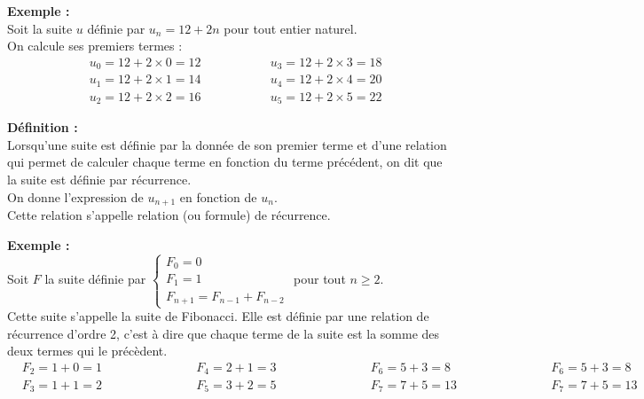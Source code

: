 \documentclass[11pt,a4paper]{article}
\begin{document}
\textbf{Exemple :} ~\\
Soit la suite $u$ définie par $u_n=12+2n$ pour tout entier naturel. \\
On calcule ses premiers termes :
\vspace{-8pt}
\begin{equation*}
  \begin{split}
    &u_0=12+2\times0=12\\
    &u_1=12+2\times1=14\\
    &u_2=12+2\times2=16
  \end{split}
  \qquad\qquad
  \begin{split}
    &u_3=12+2\times3=18\\
    &u_4=12+2\times4=20\\
    &u_5=12+2\times5=22
  \end{split}
\end{equation*}


\begin{mdframed}[style=definitionStyle]
  \textbf{Définition :} ~\\
  Lorsqu'une suite est définie par la donnée de son premier terme et d'une relation qui permet de calculer chaque
  terme en fonction du terme précédent, on dit que la suite est définie par récurrence. \\
  On donne l'expression de $u_{n+1}$ en fonction de $u_n$. \\ Cette relation s'appelle relation (ou formule) de récurrence.
\end{mdframed}

\textbf{Exemple :} ~\\
Soit $F$ la suite définie par
$\left\{
  \begin{array}{l}
    F_0=0 \\
    F_1=1 \\
    F_{n+1}=F_{n-1}+F_{n-2}
  \end{array}
  \right.$ pour tout $n\geq2$.\\

Cette suite s'appelle la suite de Fibonacci. Elle est définie par une relation de récurrence d'ordre 2, c'est à dire
que chaque terme de la suite est la somme des deux termes qui le précèdent.
\begin{equation*}
  \begin{split}
    &F_2=1+0=1\\
    &F_3=1+1=2
  \end{split}
  \qquad\qquad\qquad
  \begin{split}
    &F_4=2+1=3\\
    &F_5=3+2=5
  \end{split}
  \qquad\qquad\qquad
  \begin{split}
    &F_6=5+3=8\\
    &F_7=7+5=13
  \end{split}
  \qquad\qquad\qquad
  \begin{split}
    &F_6=5+3=8\\
    &F_7=7+5=13
  \end{split}
\end{equation*}
\end{document}
